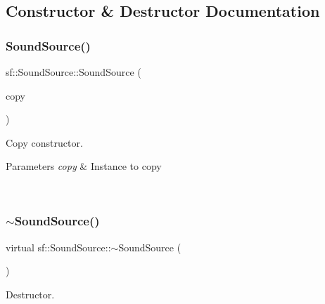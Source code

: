 \subsection{Constructor \& Destructor Documentation}
\mbox{\label{classsf_1_1_sound_source_ae0c7728c1449fdebe65749ab6fcb3170}} 
\subsubsection{\texorpdfstring{SoundSource()}{SoundSource()}\hspace{0.1cm}{\footnotesize\ttfamily [1/2]}}
{\footnotesize\ttfamily sf\+::\+Sound\+Source\+::\+Sound\+Source (\begin{DoxyParamCaption}\item[{const \mbox{\hyperlink{classsf_1_1_sound_source}{Sound\+Source}} \&}]{copy }\end{DoxyParamCaption})}



Copy constructor. 


\begin{DoxyParams}{Parameters}
{\em copy} & Instance to copy \begin{DoxyVerb}\end{DoxyVerb}
 \\
\hline
\end{DoxyParams}
\mbox{\label{classsf_1_1_sound_source_a77c7c1524f8cb81df2de9375b0f87c5c}} 
\subsubsection{\texorpdfstring{$\sim$SoundSource()}{~SoundSource()}}
{\footnotesize\ttfamily virtual sf\+::\+Sound\+Source\+::$\sim$\+Sound\+Source (\begin{DoxyParamCaption}{ }\end{DoxyParamCaption})\hspace{0.3cm}{\ttfamily [virtual]}}



Destructor. 

\begin{DoxyVerb}\end{DoxyVerb}
 \mbox{\label{classsf_1_1_sound_source_aefa4bd4460f387d81a0637d293979436}} 
